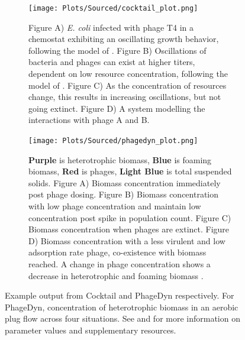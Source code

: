 \begin{figure}
    \centering
    \begin{subfigure}{0.49\linewidth}
        \centering
        \captionsetup{width=1\linewidth}
        \texttt{[image: Plots/Sourced/cocktail\_plot.png]}
        \caption{
            Figure A) \textit{E. coli} infected with phage T4 in a chemostat exhibiting an oscillating growth behavior, following the model of \citet{bohannanEffectResourceEnrichment1997}. 
            Figure B) Oscillations of bacteria and phages can exist at higher titers, dependent on low resource concentration, following the model of \citet{lenskiDynamicsInteractionsBacteria1988}. 
            Figure C) As the concentration of resources change, this results in increasing oscillations, but not going extinct. 
            Figure D) A system modelling the interactions with phage A and B. 
        }
        \label{fig:cocktail_software_output}
    \end{subfigure}
    \hfill
    \begin{subfigure}{0.49\linewidth}
        \centering
        \captionsetup{width=1\linewidth}
        \texttt{[image: Plots/Sourced/phagedyn\_plot.png]}
        \caption{
            \textcolor[HTML]{551A8C}{\textbf{Purple}} is heterotrophic biomass, 
            \textcolor[HTML]{4580B4}{\textbf{Blue}} is foaming biomass, 
            \textcolor[HTML]{FF0000}{\textbf{Red}} is phages, 
            \textcolor[HTML]{01E6EE}{\textbf{Light Blue}} is total suspended solids. 
            Figure A) Biomass concentration immediately post phage dosing. 
            Figure B) Biomass concentration with low phage concentration and maintain low concentration post spike in population count. 
            Figure C) Biomass concentration when phages are extinct. 
            Figure D) Biomass concentration with a less virulent and low adsorption rate phage, co-existence with biomass reached. 
            A change in phage concentration shows a decrease in heterotrophic and foaming biomass \cite{krysiak-baltynSimulationPhageDynamics2017}. 
        }
        \label{fig:PhageDyn_software_output}
    \end{subfigure}
    \caption{Example output from Cocktail and PhageDyn respectively. For PhageDyn, concentration of heterotrophic biomass in an aerobic plug flow across four situations.
        See \citet{nilssonCocktailComputerProgram2022} and \cite{krysiak-baltynSimulationPhageDynamics2017} for more information on parameter values and supplementary resources. 
    }
\end{figure}